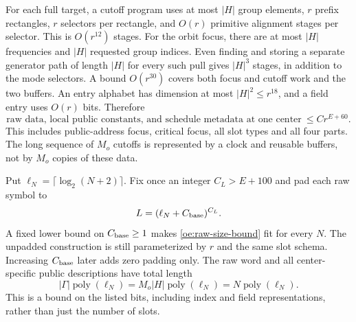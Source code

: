 For each full target, a cutoff program uses at most $|H|$ group elements,
$r$ prefix rectangles, $r$ selectors per rectangle, and $O(r)$ primitive
alignment stages per selector. This is $O(r^{12})$ stages. For the orbit
focus, there are at most $|H|$ frequencies and $|H|$ requested group
indices. Even finding and storing a separate generator path of length
$|H|$ for every such pull gives $|H|^3$ stages, in addition to the mode
selectors. A bound $O(r^{30})$ covers both focus and cutoff work and the
two buffers. An entry alphabet has dimension at most $|H|^2\leq r^{18}$,
and a field entry uses $O(r)$ bits. Therefore
\begin{equation}\label{oe:raw-size-bound}
 \text{raw data, local public constants, and schedule metadata at one
 center}\ \leq C r^{E+60}.
\end{equation}
This includes public-address focus, critical focus, all slot types and
all four parts. The long sequence of $M_o$ cutoffs is represented by a
clock and reusable buffers, not by $M_o$ copies of these data.

Put $\ell_N=\lceil\log_2(N+2)\rceil$. Fix once an integer $C_L>E+100$
and pad each raw symbol to
\begin{equation}\label{oe:raw-length}
 L=(\ell_N+C_{\rm base})^{C_L}.
\end{equation}
A fixed lower bound on $C_{\rm base}\geq1$ makes
\eqref{oe:raw-size-bound} fit for every $N$. The unpadded construction is
still parameterized by $r$ and the same slot schema. Increasing
$C_{\rm base}$ later adds zero padding only. The raw word and all
center-specific public descriptions have total length
\begin{equation}\label{oe:total-raw-size}
 |\Gamma|\operatorname{poly}(\ell_N)
 =M_o|H|\operatorname{poly}(\ell_N)
 =N\operatorname{poly}(\ell_N).
\end{equation}
This is a bound on the listed bits, including index and field
representations, rather than just the number of slots.

